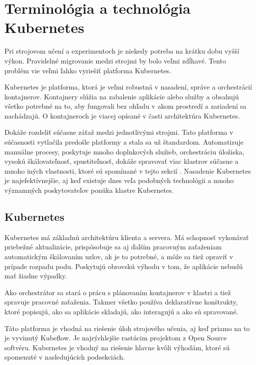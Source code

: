 

\chapter{Terminológia a technológia Kubernetes}

Pri strojovom učení a experimentoch je niekedy potreba na krátku dobu vyšší výkon. Pravidelné migrovanie medzi strojmi by bolo veľmi zdĺhavé. Tento problém vie veľmi ľahko vyriešiť platforma Kubernetes.

Kubernetes je platforma, ktorá je veľmi robustná v nasadení, správe a orchestrácií kontajnerov. Kontajnery slúžia na zabalenie aplikácie alebo služby a obsahujú všetko potrebné na to, aby fungovali bez ohľadu v akom prostredí a zariadení sa nachádzajú. O kontajneroch je viacej opísané v časti architektúra Kubernetes.

Dokáže rozdeliť súčasne záťaž medzi jednotlivými strojmi. Tato platforma v súčasnosti vytlačila predošle platformy a stala sa už štandardom. Automatizuje manuálne procesy, poskytuje mnoho doplnkových služieb, orchestráciu úložiska, vysokú škálovateľnosť, spustiteľnosť, dokáže spravovať viac klastrov súčasne a mnoho iných vlastnosti, ktoré sú spomínané v tejto sekcií \cite{vlastnostikub}. Nasadenie Kubernetes je najefektívnejšie, aj keď existuje dnes veľa podobných technológii a mnoho významných poskytovateľov ponúka klastre Kubernetes.

\section{Kubernetes}
Kubernetes má základnú architektúru klienta a servera. Má schopnosť vykonávať priebežné aktualizácie, prispôsobuje sa aj ďalším pracovným zaťaženiam automatickým škálovaním uzlov, ak je to potrebné, a môže sa tiež opraviť v prípade rozpadu podu. Poskytujú obrovskú výhodu v tom, že aplikácie nebudú mať žiadne výpadky.

Ako orchestrátor sa stará o prácu s plánovaním kontajnerov v klastri a tiež spravuje pracovné zaťaženia. Takmer všetko používa deklaratívne konštrukty, ktoré popisujú, ako sa aplikácie skladajú, ako interagujú a ako sú spravované.

Táto platforma je vhodná na riešenie úloh strojového učenia, aj keď priamo na to je vyvinutý Kubeflow. Je najrýchlejšie rastúcim projektom z Open Source softvéru. Kubernetes je vhodný na riešenie hlavne kvôli výhodám, ktoré sú spomenuté v nasledujúcich podsekciách.

